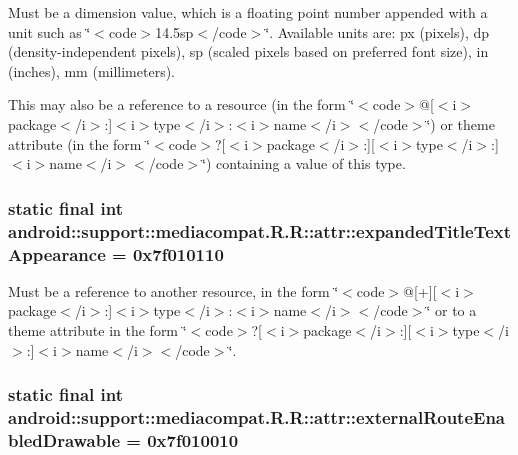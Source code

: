 Must be a dimension value, which is a floating point number appended with a unit such as \char`\"{}$<$code$>$14.5sp$<$/code$>$\char`\"{}. Available units are: px (pixels), dp (density-independent pixels), sp (scaled pixels based on preferred font size), in (inches), mm (millimeters). 

This may also be a reference to a resource (in the form \char`\"{}$<$code$>$@\mbox{[}$<$i$>$package$<$/i$>$:\mbox{]}$<$i$>$type$<$/i$>$:$<$i$>$name$<$/i$>$$<$/code$>$\char`\"{}) or theme attribute (in the form \char`\"{}$<$code$>$?\mbox{[}$<$i$>$package$<$/i$>$:\mbox{]}\mbox{[}$<$i$>$type$<$/i$>$:\mbox{]}$<$i$>$name$<$/i$>$$<$/code$>$\char`\"{}) containing a value of this type. \hypertarget{classandroid_1_1support_1_1mediacompat_1_1_r_1_1attr_3a0f1ba5754e14337714751b8b66dc62}{
\subsubsection[{expandedTitleTextAppearance}]{\setlength{\rightskip}{0pt plus 5cm}static final int android::support::mediacompat.R.R::attr::expandedTitleTextAppearance = 0x7f010110}}
\label{classandroid_1_1support_1_1mediacompat_1_1_r_1_1attr_3a0f1ba5754e14337714751b8b66dc62}


Must be a reference to another resource, in the form \char`\"{}$<$code$>$@\mbox{[}+\mbox{]}\mbox{[}$<$i$>$package$<$/i$>$:\mbox{]}$<$i$>$type$<$/i$>$:$<$i$>$name$<$/i$>$$<$/code$>$\char`\"{} or to a theme attribute in the form \char`\"{}$<$code$>$?\mbox{[}$<$i$>$package$<$/i$>$:\mbox{]}\mbox{[}$<$i$>$type$<$/i$>$:\mbox{]}$<$i$>$name$<$/i$>$$<$/code$>$\char`\"{}. \hypertarget{classandroid_1_1support_1_1mediacompat_1_1_r_1_1attr_1c1bdd7c2fc84220d0b27a6b829711fc}{
\subsubsection[{externalRouteEnabledDrawable}]{\setlength{\rightskip}{0pt plus 5cm}static final int android::support::mediacompat.R.R::attr::externalRouteEnabledDrawable = 0x7f010010}}
\label{classandroid_1_1support_1_1mediacompat_1_1_r_1_1attr_1c1bdd7c2fc84220d0b27a6b829711fc}


